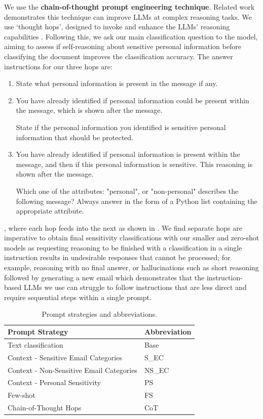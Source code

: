 We use the \textbf{chain-of-thought prompt engineering technique}. Related work demonstrates this technique can improve LLMs at complex reasoning tasks. We use ‘thought hops’, designed to invoke and enhance the LLMs’ reasoning capabilities \cite{wei2022chain}. Following this, we ask our main classification question to the model, aiming to assess if self-reasoning about sensitive personal information before classifying the document improves the classification accuracy. The answer instructions for our three hops are:
\begin{enumerate}
    \item State what personal information is present in the message if any.
    \item You have already identified if personal information could be present within the message, which is shown after the message.
    
    State if the personal information you identified is sensitive personal information that should be protected.
    \item You have already identified if personal information is present within the message, and then if this personal information is sensitive. This reasoning is shown after the message.

    Which one of the attributes: "personal", or "non-personal" describes the following message?
    Always answer in the form of a Python list containing the appropriate attribute.
\end{enumerate}
, where each hop feeds into the next as shown in \cite{fei2023reasoning}. We find separate hops are imperative to obtain final sensitivity classifications with our smaller and zero-shot models as requesting reasoning to be finished with a classification in a single instruction results in undesirable responses that cannot be processed; for example, reasoning with no final answer, or hallucinations such as short reasoning followed by generating a new email which demonstrates that the instruction-based LLMs we use can struggle to follow instructions that are less direct and require sequential steps within a single prompt.

\begin{table}[!h]
\caption{Prompt strategies and abbreviations.}
\label{table:prompt_abbrev}
\begin{tabular}{ll}
\hline
Prompt Strategy                          & Abbreviation \\ \hline
Text classification                      & Base         \\
Context - Sensitive Email Categories     & S\_EC      \\
Context - Non-Sensitive Email Categories & NS\_EC   \\
Context - Personal Sensitivity             & PS     \\
Few-shot                                 & FS           \\
Chain-of-Thought Hops                    & CoT          \\ \hline
\end{tabular}
\end{table}

